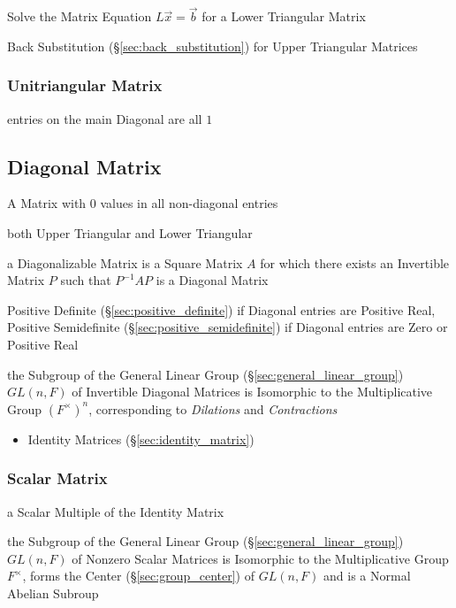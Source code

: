 Solve the Matrix Equation $L\vec{x} = \vec{b}$ for a Lower Triangular Matrix

\fist Back Substitution (\S\ref{sec:back_substitution}) for Upper Triangular
Matrices



\subsubsection{Unitriangular Matrix}\label{sec:unitriangular_matrix}

entries on the main Diagonal are all $1$



\subsection{Diagonal Matrix}\label{sec:diagonal_matrix}

A Matrix with $0$ values in all non-diagonal entries

both Upper Triangular and Lower Triangular

a Diagonalizable Matrix is a Square Matrix $A$ for which there exists an
Invertible Matrix $P$ such that $P^{-1}AP$ is a Diagonal Matrix

Positive Definite (\S\ref{sec:positive_definite}) if Diagonal entries are
Positive Real, Positive Semidefinite (\S\ref{sec:positive_semidefinite}) if
Diagonal entries are Zero or Positive Real

the Subgroup of the General Linear Group (\S\ref{sec:general_linear_group})
$GL(n,F)$ of Invertible Diagonal Matrices is Isomorphic to the Multiplicative
Group $(F^\times)^n$, corresponding to \emph{Dilations} and \emph{Contractions}

\begin{itemize}
  \item Identity Matrices (\S\ref{sec:identity_matrix})
\end{itemize}



\subsubsection{Scalar Matrix}\label{sec:scalar_matrix}

a Scalar Multiple of the Identity Matrix

the Subgroup of the General Linear Group (\S\ref{sec:general_linear_group})
$GL(n,F)$ of Nonzero Scalar Matrices is Isomorphic to the Multiplicative Group
$F^\times$, forms the Center (\S\ref{sec:group_center}) of $GL(n,F)$ and is a
Normal Abelian Subroup

